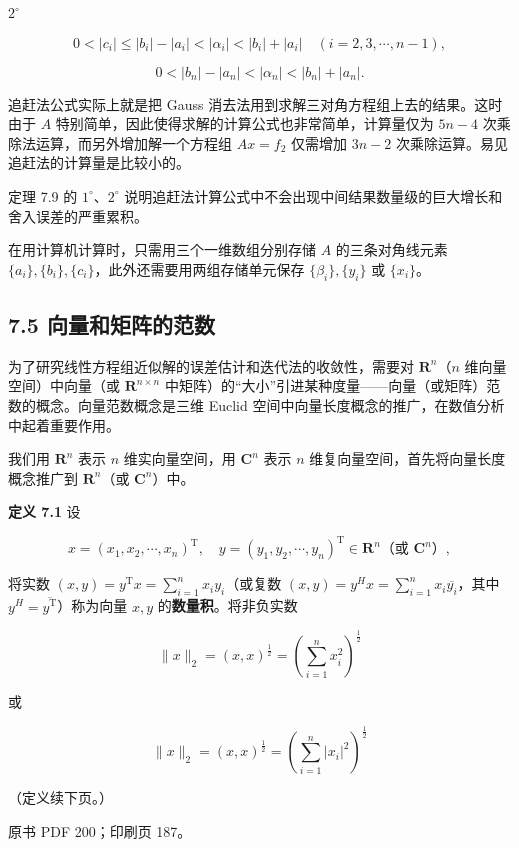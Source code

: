 \documentclass[
  10pt,
  fontset=fandol]{ctexart}
\begin{document}
\(2^\circ\)

\[
0<|c_i|\leqslant|b_i|-|a_i|<|\alpha_i|<|b_i|+|a_i|\quad(i=2,3,\cdots,n-1),
\]

\[
0<|b_n|-|a_n|<|\alpha_n|<|b_n|+|a_n|.
\]

追赶法公式实际上就是把 Gauss
消去法用到求解三对角方程组上去的结果。这时由于 \(A\)
特别简单，因此使得求解的计算公式也非常简单，计算量仅为 \(5n-4\)
次乘除法运算，而另外增加解一个方程组 \(Ax=f_2\) 仅需增加 \(3n-2\)
次乘除运算。易见追赶法的计算量是比较小的。

定理 7.9 的 \(1^\circ\)、\(2^\circ\)
说明追赶法计算公式中不会出现中间结果数量级的巨大增长和舍入误差的严重累积。

在用计算机计算时，只需用三个一维数组分别存储 \(A\) 的三条对角线元素
\(\{a_i\},\{b_i\},\{c_i\}\)，此外还需要用两组存储单元保存
\(\{\beta_i\},\{y_i\}\) 或 \(\{x_i\}\)。

\subsection{7.5
向量和矩阵的范数}\label{ux5411ux91cfux548cux77e9ux9635ux7684ux8303ux6570}

为了研究线性方程组近似解的误差估计和迭代法的收敛性，需要对
\(\mathbf R^n\)（\(n\) 维向量空间）中向量（或 \(\mathbf R^{n\times n}\)
中矩阵）的``大小''引进某种度量------向量（或矩阵）范数的概念。向量范数概念是三维
Euclid 空间中向量长度概念的推广，在数值分析中起着重要作用。

我们用 \(\mathbf R^n\) 表示 \(n\) 维实向量空间，用 \(\mathbf C^n\) 表示
\(n\) 维复向量空间，首先将向量长度概念推广到 \(\mathbf R^n\)（或
\(\mathbf C^n\)）中。

\textbf{定义 7.1} 设

\[
x=(x_1,x_2,\cdots,x_n)^{\mathrm T},\quad y=(y_1,y_2,\cdots,y_n)^{\mathrm T}\in\mathbf R^n\text{（或 }\mathbf C^n\text{）},
\]

将实数 \((x,y)=y^{\mathrm T}x=\sum_{i=1}^{n}x_iy_i\)（或复数
\((x,y)=y^Hx=\sum_{i=1}^{n}x_i\overline{y_i}\)，其中
\(y^H=\overline{y^{\mathrm T}}\)）称为向量 \(x,y\)
的\textbf{数量积}。将非负实数

\[
\|x\|_2=(x,x)^{\frac12}=\left(\sum_{i=1}^{n}x_i^2\right)^{\frac12}
\]

或

\[
\|x\|_2=(x,x)^{\frac12}=\left(\sum_{i=1}^{n}|x_i|^2\right)^{\frac12}
\]

（定义续下页。）

\clearpage

原书 PDF 200；印刷页 187。
\end{document}
